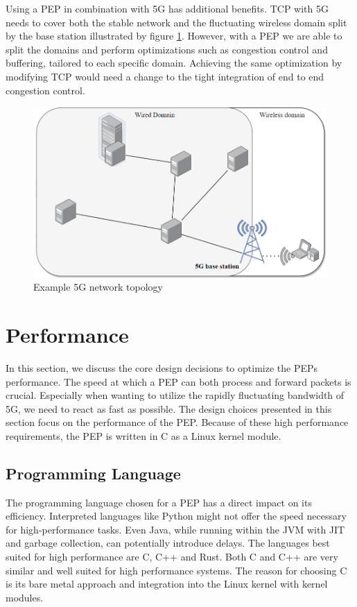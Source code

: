 \documentclass[a4paper,english, 11pt]{report}
\begin{document}
Using a PEP in combination with 5G has additional benefits. TCP with 5G needs to cover both the stable network and the fluctuating wireless domain split by the base station illustrated by figure \ref{fig:5g_topology}. However, with a PEP we are able to split the domains and perform optimizations such as congestion control and buffering, tailored to each specific domain. Achieving the same optimization by modifying TCP would need a change to the tight integration of end to end congestion control.\\

\begin{figure}[h!] %
	\centering
	\includegraphics[scale=0.6]{../diagrams/drawio/deployment_without_pep.png}
  	\caption{Example 5G network topology}
  	\label{fig:5g_topology}
\end{figure}


\section{Performance}
In this section, we discuss the core design decisions to optimize the PEPs performance.
The speed at which a PEP can both process and forward packets is crucial. Especially when wanting to utilize the rapidly fluctuating bandwidth of 5G, we need to react as fast as possible. The design choices presented in this section focus on the performance of the PEP. Because of these high performance requirements, the PEP is written in C as a Linux kernel module. 

\subsection{Programming Language}
The programming language chosen for a PEP has a direct impact on its efficiency. Interpreted languages like Python might not offer the speed necessary for high-performance tasks. Even Java, while running within the JVM with JIT and garbage collection, can potentially introduce delays. The languages best suited for high performance are C, C++ and Rust. Both C and C++ are very similar and well suited for high performance systems. The reason for choosing C is its bare metal approach and integration into the Linux kernel with kernel modules.
\end{document}
